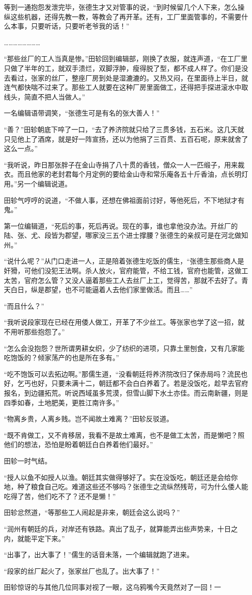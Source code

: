 等到一通抱怨发泄完毕，张德生才又对管事的说，“到时候留几个人下来，怎么操纵这些机器，还得先教一教，等教会了再开革。还有，工厂里面管事的，不需要什么本事，只要听话，只要听老爷我的话！”

……………………

“那些丝厂的工人当真是惨。”田轸回到编辑部，刚换了衣服，就连声道，“在工厂里只做了半年的工，就双手溃烂，双脚浮肿，瘦得脱了型，都不成人样了。你们是没去看过，张家的丝厂，整座厂房到处是湿漉漉的。又热又闷，在里面待上半日，就连气都快喘不过来了。那些工人就要在这种厂房里面做工，还得把手探进滚水中取线头，简直不把人当做人。”

一名编辑语带调笑，“张德生可是有名的张大善人！”

“善？”田轸朝底下啐了一口，“去了养济院就只给了三贯多钱，五石米。这几天就只见他上了酒席，就是好一阵宣扬，还以为他捐了三百贯、五百石呢，原来就舍了这么一点。”

“我听说，昨日那张胖子在金山寺捐了八十贯的香钱，僧众一人一匹缎子，用来裁衣。而且他家的老封君每个月定例的要给金山寺和常乐庵各五十斤香油，点长明灯用。”另一个编辑说道。

田轸气哼哼的说道，“不做人事，还想在佛祖面前讨好，等他死后，不下地狱才有鬼。”

第一位编辑道，“死后的事，死后再说。现在的事，谁也拿他没办法。开丝厂的陆、张、尤、段皆为郡望，哪家没三五个进士撑腰？张德生的亲叔可是在河北做知州。”

“说什么呢？”从门口走进一人，正是陪着张德生吃饭的儒生，“张德生那些商人是奸猾，可他们没犯王法啊。杀人放火，官府能管，不给工钱，官府也能管，这做工太苦，官府怎么管？又没人逼着那些工人去丝厂上工，觉得苦，那就不去好了。青天白日，纵是郡望，也不可能逼着人去他们家里做活。而且……”

“而且什么？”

“我听说段家现在已经在用倭人做工，开革了不少丝工。等张家也学了这一招，就不用听那些抱怨了。”

“怎么会没抱怨？世所谓男耕女织，少了纺织的进项，只靠土里刨食，又有几家能吃饱饭的？倾家荡产的也是所在多有。”

“吃不饱饭可以去拓边啊。”那儒生道，“没看朝廷将养济院改归了保赤局吗？流民也好，乞丐也好，只要未满十二，朝廷都不会白白养着了。若是没饭吃，趁早去官府报名，到边疆拓荒。听说西域虽多荒漠，但雪山脚下水土亦佳。而云南新疆，则是四季如春，土地肥美，更胜江南许多。”

“物离乡贵，人离乡贱。岂不闻故土难离？”田轸反驳道。

“既不肯做工，又不肯移居，我看不是故土难离，也不是做工太苦，而是懒吧？照他们的想法，恐怕是盼着朝廷白白养着他们最好。”

田轸一时气结。

“授人以鱼不如授人以渔。朝廷其实做得够好了。实在没饭吃，朝廷还是会给你地，种了粮食自己吃。难道这些还不够吗？张德生之流纵然残苛，可为什么倭人能吃得了苦，他们吃不了？还不是懒！”

田轸忿然道，“等那些工人闹起是非来，朝廷会这么说吗？”

“润州有朝廷的兵，对岸还有铁路。真出了乱子，就算能弄出些声势来，十日之内，就能平定下来。”

“出事了，出大事了！”儒生的话音未落，一个编辑就跑了进来。

“段家的丝厂起火了，张家丝厂也乱了。出大事了！”

田轸惊讶的与其他几位同事对视了一眼，这乌鸦嘴今天竟然对了一回！一

